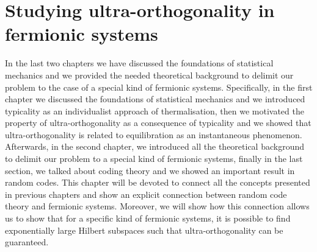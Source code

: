 \chapter{Studying ultra-orthogonality in fermionic systems}
\noindent In the last two chapters we have discussed the foundations of statistical mechanics and we provided the needed theoretical background to delimit our problem to the case of a special kind of fermionic systems. Specifically, in the first chapter we discussed the foundations of statistical mechanics and we introduced typicality as an individualist approach of thermalisation, then we motivated the property of ultra-orthogonality as a consequence of typicality and we showed that ultra-orthogonality is related to equilibration as an instantaneous phenomenon. Afterwards, in the second chapter, we introduced all the theoretical background to delimit our problem to a special kind of fermionic systems, finally in the last section, we talked about coding theory and we showed an important result in random codes. This chapter will be devoted to connect all the concepts presented in previous chapters and show an explicit connection between random code theory and fermionic systems. Moreover, we will show how this connection allows us to show that for a specific kind of fermionic systems, it is possible to find exponentially large Hilbert subspaces such that ultra-orthogonality can be guaranteed.
